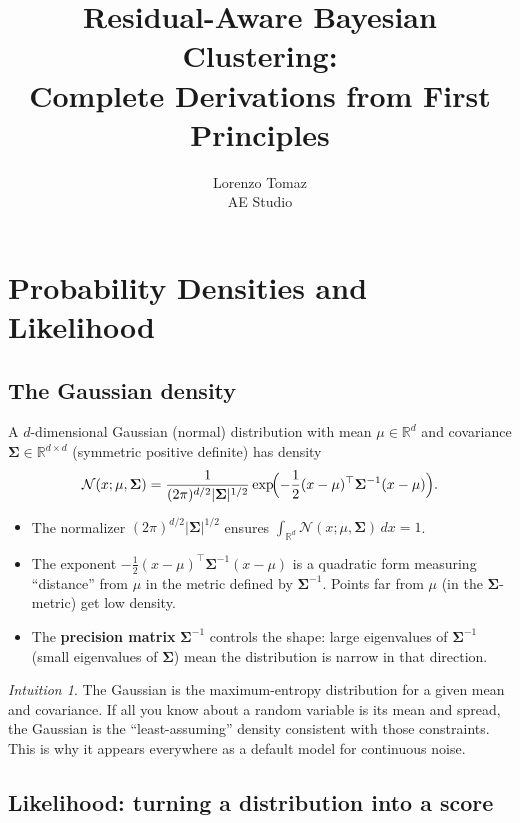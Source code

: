 \documentclass[11pt]{article}
\title{Residual-Aware Bayesian Clustering:\\[0.3em]
\large Complete Derivations from First Principles}
\author{Lorenzo Tomaz\\AE Studio}
\date{}
\theoremstyle{definition}
\theoremstyle{plain}
\theoremstyle{remark}
\newtheorem{intuition}{Intuition}[section]
\newcommand{\R}{\mathbb{R}}
\newcommand{\Sv}{\boldsymbol{\Sigma}}
\begin{document}
\maketitle

\tableofcontents
\newpage

\section{Probability Densities and Likelihood}

\subsection{The Gaussian density}

A $d$-dimensional Gaussian (normal) distribution with mean $\mu\in\R^d$ and covariance $\Sv\in\R^{d\times d}$ (symmetric positive definite) has density
\begin{equation}
  \mathcal{N}(x;\mu,\Sv) = \frac{1}{(2\pi)^{d/2}|\Sv|^{1/2}}\exp\!\Bigl(-\frac{1}{2}(x-\mu)^\top\Sv^{-1}(x-\mu)\Bigr).
\end{equation}
\begin{itemize}[leftmargin=*,itemsep=2pt]
  \item The normalizer $(2\pi)^{d/2}|\Sv|^{1/2}$ ensures $\int_{\R^d}\mathcal{N}(x;\mu,\Sv)\,dx=1$.
  \item The exponent $-\frac{1}{2}(x-\mu)^\top\Sv^{-1}(x-\mu)$ is a quadratic form measuring ``distance'' from $\mu$ in the metric defined by $\Sv^{-1}$. Points far from $\mu$ (in the $\Sv$-metric) get low density.
  \item The \textbf{precision matrix} $\Sv^{-1}$ controls the shape: large eigenvalues of $\Sv^{-1}$ (small eigenvalues of $\Sv$) mean the distribution is narrow in that direction.
\end{itemize}

\begin{intuition}
The Gaussian is the maximum-entropy distribution for a given mean and covariance. If all you know about a random variable is its mean and spread, the Gaussian is the ``least-assuming'' density consistent with those constraints. This is why it appears everywhere as a default model for continuous noise.
\end{intuition}

\subsection{Likelihood: turning a distribution into a score}
\end{document}
